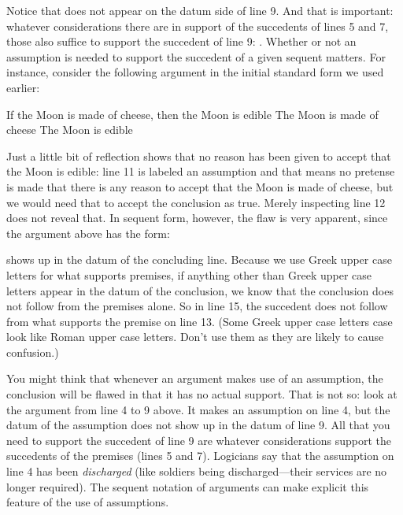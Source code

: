 Notice that  does not appear on the datum side of line 9. And that is 
important: whatever considerations there are in support of the succedents of 
lines 5 and 7, those also suffice to support the succedent of line 9:    
. Whether or not an assumption is needed to support the 
succedent of a given sequent matters. For instance, consider the following 
argument in the initial standard form we used earlier:

\begin{argument}
 \aitem If the Moon is made of cheese, then the Moon is edible
 \aitem The Moon is made of cheese
 \aitem The Moon is edible
\end{argument}

Just a little bit of reflection shows that no reason has been given to accept 
that the Moon is edible: line 11 is labeled an assumption and that means no 
pretense is made that there is any reason to accept that the Moon is made of 
cheese, but we would need that to accept the conclusion as true. Merely 
inspecting line 12 does not reveal that. In sequent form, however, the flaw is 
very apparent, since the argument above has the form:

\begin{argument}
 \aitem {}
  \aitem {}
  \aitem {}
 \end{argument}

  shows up in the datum of the concluding line. Because we use Greek upper 
 case letters for what supports premises, if anything other than Greek upper 
 case letters appear in the datum of the conclusion, we know that the conclusion 
 does not follow from the premises alone. So in line 15, the succedent  
 does not follow from what supports the premise on line 13. (Some Greek upper 
 case letters case look like Roman upper case letters. Don't use them as they 
 are likely to cause confusion.)

 You might think that whenever an argument makes use of an assumption, the 
 conclusion will be flawed in that it has no actual support. That is not so: 
 look at the argument from line 4 to 9 above. It makes an assumption on line 4, 
 but the datum of the assumption does not show up in the datum of line 9.  All 
 that you need to support the succedent of line 9 are whatever considerations 
 support the succedents of the premises (lines 5 and 7).  Logicians say that the 
 assumption on line 4 has been \emph{discharged} (like soldiers being 
 discharged---their services are no longer required). The sequent notation of 
 arguments can make explicit this feature of the use of assumptions.

